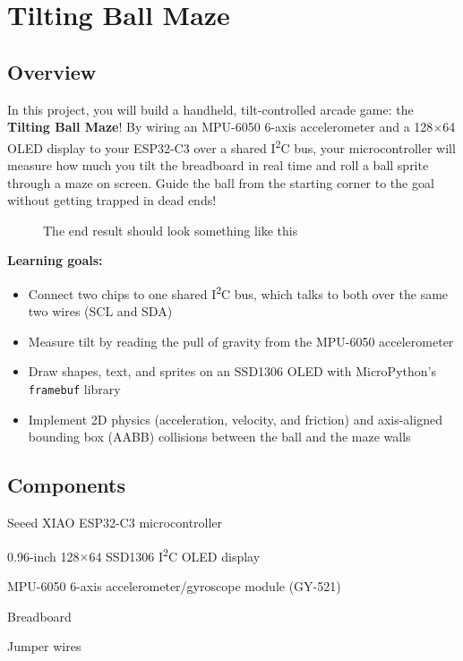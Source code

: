 \chapter{Tilting Ball Maze}

\section{Overview}
In this project, you will build a handheld, tilt-controlled arcade game: the \textbf{Tilting Ball Maze}!
By wiring an MPU-6050 6-axis accelerometer and a 128$\times$64 OLED display to your ESP32-C3 over a shared
I\textsuperscript{2}C bus, your microcontroller will measure how much you tilt the breadboard in real time
and roll a ball sprite through a maze on screen. Guide the ball from the starting corner to the goal without
getting trapped in dead ends!

\begin{figure}[H]
\centering
    \caption{The end result should look something like this}
\end{figure}

\begin{tcolorbox}[colback=blue!5!white,colframe=blue!40!black]
    \textbf{Learning goals:}
    \begin{itemize}
        \item Connect two chips to one shared I\textsuperscript{2}C bus, which talks to both over the same
              two wires (SCL and SDA)
        \item Measure tilt by reading the pull of gravity from the MPU-6050 accelerometer
        \item Draw shapes, text, and sprites on an SSD1306 OLED with MicroPython's \texttt{framebuf} library
        \item Implement 2D physics (acceleration, velocity, and friction) and axis-aligned bounding box
              (AABB) collisions between the ball and the maze walls
    \end{itemize}
\end{tcolorbox}

\pagebreak

\section{Components}

\begin{components}
    \item Seeed XIAO ESP32-C3 microcontroller
    \item 0.96-inch 128$\times$64 SSD1306 I\textsuperscript{2}C OLED display
    \item MPU-6050 6-axis accelerometer/gyroscope module (GY-521)
    \item Breadboard
    \item Jumper wires
\end{components}

